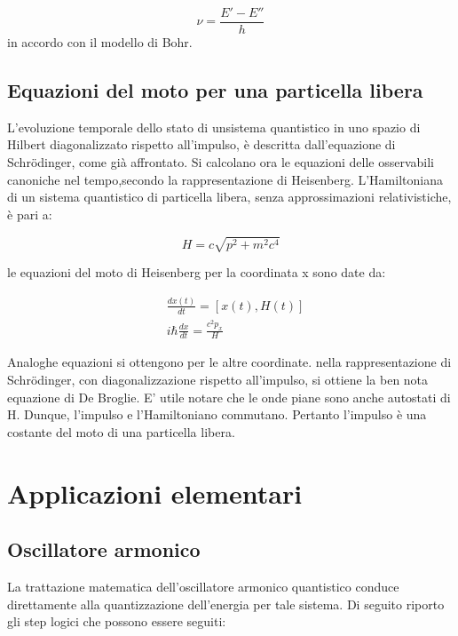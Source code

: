 \documentclass{article}
\begin{document}
\begin{equation}
    \nu= \frac{E'-E''}{h}
\end{equation}
in accordo con il modello di Bohr.

\subsection{Equazioni del moto per una particella libera}
L'evoluzione temporale dello stato di unsistema quantistico in uno spazio di Hilbert diagonalizzato rispetto all'impulso,
è descritta dall'equazione di Schrödinger, come già affrontato.
Si calcolano ora le equazioni delle osservabili canoniche nel tempo,secondo la rappresentazione di Heisenberg.
L'Hamiltoniana di un sistema quantistico di particella libera, senza approssimazioni relativistiche, è pari a:

\begin{equation}
    H=c\sqrt{p^2+m^2c^4}
\end{equation}

le equazioni del moto di Heisenberg per la coordinata x sono date da:

\begin{equation}
    \begin{aligned}
        & \frac{dx(t)}{dt}= [x(t),H(t)] \\
        & i\hbar \frac{dx}{dt}= \frac{c^2p_x}{H}
    \end{aligned}
\end{equation}

Analoghe equazioni si ottengono per le altre coordinate.
nella rappresentazione di Schrödinger, con diagonalizzazione rispetto all'impulso, si ottiene la ben nota equazione di De Broglie.
E' utile notare che le onde piane sono anche autostati di H. Dunque, l'impulso e l'Hamiltoniano commutano. Pertanto l'impulso è una costante del moto di una particella libera.

\section{Applicazioni elementari}
\subsection{Oscillatore armonico}
La trattazione matematica dell'oscillatore armonico quantistico conduce direttamente alla quantizzazione dell'energia per tale sistema.
Di seguito riporto gli step logici che possono essere seguiti:
\end{document}
